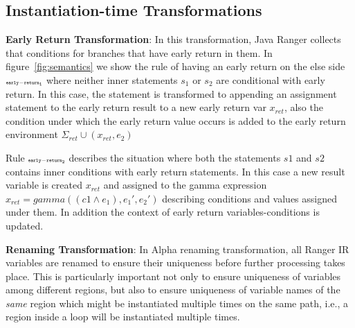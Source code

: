 \subsection{Instantiation-time Transformations}
\label{sec:instantiationTransformations}

\textbf{Early Return Transformation}: In this transformation, Java Ranger collects that conditions for branches that have early return in them. In figure~\ref{fig:semantics} we show the rule of having an early return on the else side $\scriptscriptstyle\mathtt{early-return_1}$ where neither inner statements $s_1$ or $s_2$ are conditional with early return. In this case, the statement is transformed to appending an assignment statement to the early return result to a new early return var $x_{ret}$, also the condition under which the early return value occurs is added to the early return environment $\Sigma_{ret} \cup (x_{ret}, e_2)$ 

Rule $\scriptscriptstyle\mathtt{early-return_2}$ describes the situation where both the statements $s1$ and $s2$ contains inner conditions with early return statements. In this case a new result variable is created $x_{ret}$ and assigned to the gamma expression $x_{ret} = gamma((c1 \wedge e_1), e_1',  e_2')$ describing conditions and values assigned under them. In addition the context of early return variables-conditions is updated. 

\textbf{Renaming Transformation}: In Alpha renaming transformation, all Ranger IR variables are renamed to ensure their uniqueness before further processing takes place. 
%
This is particularly important not only to ensure uniqueness of variables among different regions, but also to ensure
uniqueness of variable names of the \textit{same} region which might be instantiated multiple times on the same path,
i.e., a region inside a loop will be instantiated multiple times.

